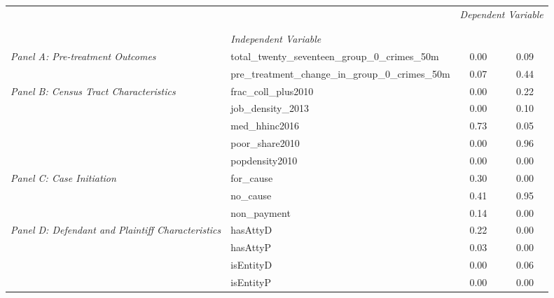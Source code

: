 \begin{tabular}{llcc}
\toprule
 &  & \multicolumn{2}{c}{\textit{Dependent Variable}} \\
\cline{3-4}
\\
 &  &  &  \\
 & \emph{Independent Variable} &  &  \\
\midrule
\multirow[c]{2}{3cm}{\textit{Panel A: Pre-treatment Outcomes}} & total_twenty_seventeen_group_0_crimes_50m & 0.00 & 0.09 \\
 & pre_treatment_change_in_group_0_crimes_50m & 0.07 & 0.44 \\
\cline{1-4}
\multirow[c]{5}{3cm}{\textit{Panel B: Census Tract Characteristics}} & frac_coll_plus2010 & 0.00 & 0.22 \\
 & job_density_2013 & 0.00 & 0.10 \\
 & med_hhinc2016 & 0.73 & 0.05 \\
 & poor_share2010 & 0.00 & 0.96 \\
 & popdensity2010 & 0.00 & 0.00 \\
\cline{1-4}
\multirow[c]{3}{3cm}{\textit{Panel C: Case Initiation}} & for_cause & 0.30 & 0.00 \\
 & no_cause & 0.41 & 0.95 \\
 & non_payment & 0.14 & 0.00 \\
\cline{1-4}
\multirow[c]{4}{3cm}{\textit{Panel D: Defendant and Plaintiff Characteristics}} & hasAttyD & 0.22 & 0.00 \\
 & hasAttyP & 0.03 & 0.00 \\
 & isEntityD & 0.00 & 0.06 \\
 & isEntityP & 0.00 & 0.00 \\
\cline{1-4}
\bottomrule
\end{tabular}

